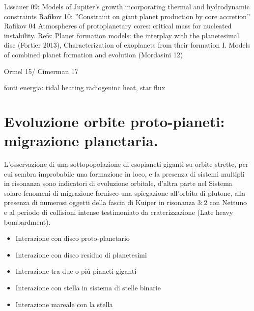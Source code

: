 \begin{workout}
Lissauer 09: Models of Jupiter’s growth incorporating thermal and hydrodynamic constraints
Rafikov 10: ''Constraint on giant planet production by core accretion''
Rafikov 04 Atmospheres of protoplanetary cores: critical mass for nucleated instability.
Refs: Planet formation models: the interplay with the planetesimal disc (Fortier 2013), Characterization of exoplanets from their formation I. Models of combined planet formation and evolution (Mordasini 12)
\end{workout}

\begin{workout}
Ormel 15/ Cimerman 17
\end{workout}


\begin{workout}
fonti energia: tidal heating radiogeninc heat, star flux
\end{workout}


{\let\clearpage\relax\let\cleardoublepage\relax
\chapter{Evoluzione orbite proto-pianeti: migrazione planetaria.}
}

L'osservazione di una sottopopolazione di esopianeti giganti su orbite strette, per cui sembra improbabile una formazione in loco, e la presenza di sistemi multipli in risonanza sono indicatori di evoluzione orbitale, d'altra parte nel Sistema solare fenomeni di migrazione fornisco una spiegazione all'orbita di plutone, alla presenza di numerosi oggetti della fascia di Kuiper in risonanza $3:2$ con Nettuno e al periodo di collisioni intense testimoniato da craterizzazione (Late heavy bombardment).


\begin{itemize}
\item Interazione con disco proto-planetario

\item Interazione con disco residuo di planetesimi

\item Interazione tra due o pi\'u pianeti giganti

\item Interazione con stella in sistema di stelle binarie

\item Interazione mareale con la stella

\end{itemize}

